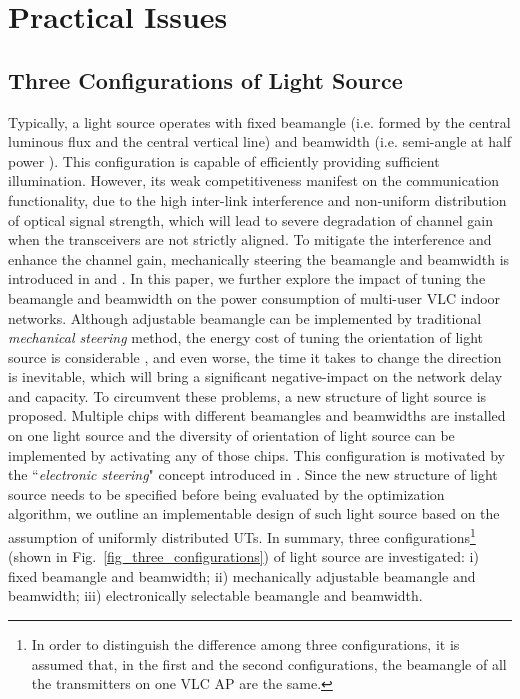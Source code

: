 \documentclass[10pt,journal]{IEEEtran}
\begin{document}
\section{Practical Issues}\label{pracitcal_issues}


\subsection{Three Configurations of Light Source}
Typically, a light source operates with fixed beamangle (i.e. formed by the central luminous flux and the central vertical line) and beamwidth (i.e. semi-angle at half power ). This configuration is capable of efficiently providing sufficient illumination. However, its weak competitiveness manifest on the communication functionality, due to the high inter-link interference and non-uniform distribution of optical signal strength, which will lead to severe degradation of channel gain when the transceivers are not strictly aligned. To mitigate the interference and enhance the channel gain, mechanically steering the beamangle and beamwidth is introduced in \cite{tronghop2012modeling} and \cite{li2012vico}. In this paper, we further explore the impact of tuning the beamangle and beamwidth on the power consumption of multi-user VLC indoor networks. Although adjustable beamangle can be implemented by traditional {\it mechanical steering} method, the energy cost of tuning the orientation of light source is considerable \cite{nakhkoob2009multi}, and even worse, the time it takes to change the direction is inevitable, which will bring a significant negative-impact on the network delay and capacity. To circumvent these problems, a new structure of light source is proposed. Multiple chips with different beamangles and beamwidths are installed on one light source and the diversity of orientation of light source can be implemented by activating any of those chips. This configuration is motivated by the ``{\it electronic steering}" concept introduced in \cite{nakhkoob2009multi}. Since the new structure of light source needs to be specified before being evaluated by the optimization algorithm, we outline an implementable design of such light source based on the assumption of uniformly distributed UTs. In summary, three configurations\footnote{In order to distinguish the difference among three configurations, it is assumed that, in the first and the second configurations, the beamangle of all the transmitters on one VLC AP are the same.} (shown in Fig.~\ref{fig_three_configurations}) of light source are investigated: i) fixed beamangle and beamwidth; ii) mechanically adjustable beamangle and beamwidth; iii) electronically selectable beamangle and beamwidth.
\end{document}
